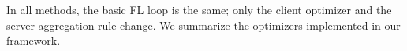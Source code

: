\documentclass[10pt,twocolumn,letterpaper]{article}
\begin{document}
    In all methods, the basic FL loop is the same; only the client optimizer
    and the server aggregation rule change.
    We summarize the optimizers implemented in our framework.






\end{document}
